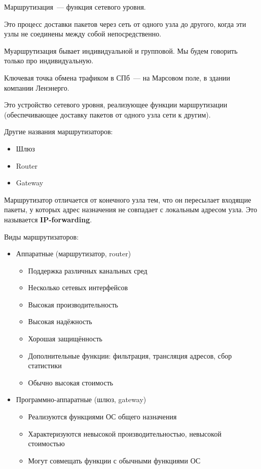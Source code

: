 
Маршрутизация~--- функция сетевого уровня.

Это процесс доставки пакетов через сеть от одного узла до другого, когда эти узлы не соединены между собой непосредственно.

Муаршрутизация бывает индивидуальной и групповой. Мы будем говорить только про индивидуальную.

Ключевая точка обмена трафиком в СПб~--- на Марсовом поле, в здании компании Ленэнерго.


Это устройство сетевого уровня, реализующее функции маршрутизации (обеспечивающее доставку пакетов от одного узла сети к другим).

Другие названия маршрутизаторов:
\begin{itemize}
    \item Шлюз
    \item Router
    \item Gateway
\end{itemize}

Маршрутизатор отличается от конечного узла тем, что он пересылает входящие пакеты, у которых адрес назначения не совпадает с локальным адресом узла. Это называется {\bf IP-forwarding}.

Виды маршрутизаторов:
\begin{itemize}
    \item Аппаратные (маршрутизатор, router)
    \begin{itemize}
        \item Поддержка различных канальных сред
        \item Несколько сетевых интерфейсов
        \item Высокая производительность
        \item Высокая надёжность
        \item Хорошая защищённость
        \item Дополнительные функции: фильтрация, трансляция адресов, сбор статистики
        \item Обычно высокая стоимость
    \end{itemize}
    \item Программно-аппаратные (шлюз, gateway)
    \begin{itemize}
        \item Реализуются функциями ОС общего назначения
        \item Характеризуются невысокой производительностью, невысокой стоимостью
        \item Могут совмещать функции с обычными функциями ОС
    \end{itemize}
\end{itemize}

